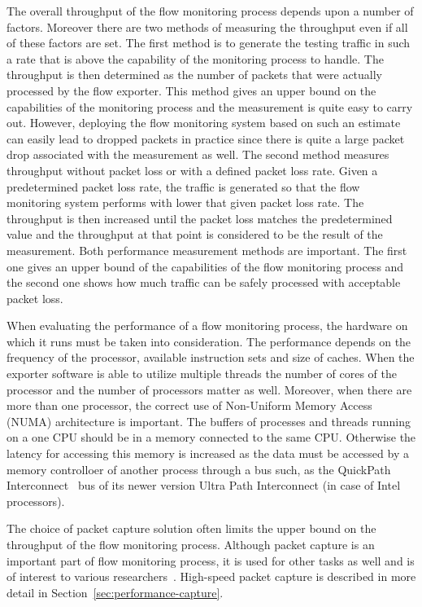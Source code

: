 The overall throughput of the flow monitoring process depends upon a number of factors. Moreover there are two methods of measuring the throughput even if all of these factors are set. The first method is to generate the testing traffic in such a rate that is above the capability of the monitoring process to handle. The throughput is then determined as the number of packets that were actually processed by the flow exporter. This method gives an upper bound on the capabilities of the monitoring process and the measurement is quite easy to carry out. However, deploying the flow monitoring system based on such an estimate can easily lead to dropped packets in practice since there is quite a large packet drop associated with the measurement as well. The second method measures throughput without packet loss or with a defined packet loss rate. Given a predetermined packet loss rate, the traffic is generated so that the flow monitoring system performs with lower that given packet loss rate. The throughput is then increased until the packet loss matches the predetermined value and the throughput at that point is considered to be the result of the measurement. Both performance measurement methods are important. The first one gives an upper bound of the capabilities of the flow monitoring process and the second one shows how much traffic can be safely processed with acceptable packet loss.

When evaluating the performance of a flow monitoring process, the hardware on which it runs must be taken into consideration. The performance depends on the frequency of the processor, available instruction sets and size of caches. When the exporter software is able to utilize multiple threads the number of cores of the processor and the number of processors matter as well. Moreover, when there are more than one processor, the correct use of Non-Uniform Memory Access (NUMA) architecture is important. The buffers of processes and threads running on a one CPU should be in a memory connected to the same CPU. Otherwise the latency for accessing this memory is increased as the data must be accessed by a memory controlloer of another process through a bus such, as the QuickPath Interconnect~\cite{IntelCorporation-2009-Introduction} bus of its newer version Ultra Path Interconnect (in case of Intel processors).

The choice of packet capture solution often limits the upper bound on the throughput of the flow monitoring process. Although packet capture is an important part of flow monitoring process, it is used for other tasks as well and is of interest to various researchers~\cite{Garcia-Dorado-2013-High, Nassopulos-2014-Flow}. High-speed packet capture is described in more detail in Section~\ref{sec:performance-capture}.

